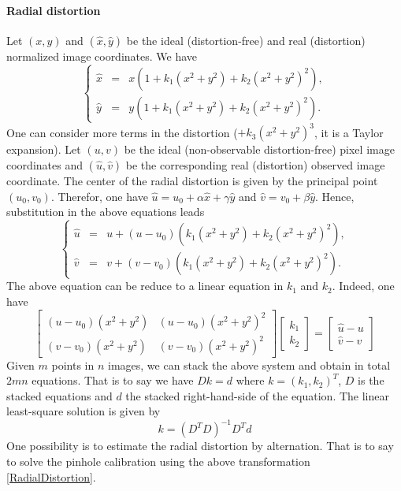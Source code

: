 \documentclass[11pt,a4paper]{article}
\begin{document}
\paragraph{Radial distortion}
Let $(x,y)$ and $(\hat{x},\hat{y})$ be the ideal (distortion-free) and real (distortion) normalized image coordinates. We have
\begin{equation}
\left\{
\begin{array}{rcl}
\hat{x} &=& x \left(1 + k_1(x^2+y^2) + k_2(x^2+y^2)^2\right) ,\\
\hat{y} &=& y \left(1 + k_1(x^2+y^2) + k_2(x^2+y^2)^2\right) .
\end{array}
\right.
\end{equation}
One can consider more terms in the distortion ($+k_3(x^2+y^2)^3$, it is a Taylor expansion). Let $(u,v)$ be the ideal (non-observable distortion-free) pixel image coordinates and $(\hat{u},\hat{v})$ be the corresponding real (distortion) observed image coordinate. The center of the radial distortion is given by the principal point $(u_0,v_0)$. Therefor, one have $\hat{u} = u_0 + \alpha \hat{x} + \gamma \hat{y}$ and $\hat{v} = v_0 + \beta \hat{y}$. Hence, substitution in the above equations leads
\begin{equation}
\left\{
\begin{array}{rcl}
\hat{u} &=& u + (u-u_0) \left(k_1(x^2+y^2) + k_2(x^2+y^2)^2\right) ,\\
\hat{v} &=& v + (v-v_0) \left(k_1(x^2+y^2) + k_2(x^2+y^2)^2\right) .
\end{array}
\right.
\label{RadialDistortion}
\end{equation}
The above equation can be reduce to a linear equation in $k_1$ and $k_2$. Indeed, one have
\begin{equation}
\left[
\begin{array}{cc}
(u-u_0)(x^2+y^2) & (u-u_0)(x^2+y^2)^2 \\
(v-v_0)(x^2+y^2) & (v-v_0)(x^2+y^2)^2 
\end{array}
\right]
\left[
\begin{array}{c}
k_1 \\
k_2
\end{array}
\right]
=
\left[
\begin{array}{c}
\hat{u}-u \\
\hat{v}-v
\end{array}
\right]
\end{equation}
Given $m$ points in $n$ images, we can stack the above system and obtain in total $2mn$ equations. That is to say we have $D k = d $ where $k=(k_1,k_2)^T$, $D$ is the stacked equations and $d$ the stacked right-hand-side of the equation. The linear least-square solution is given by
\begin{equation}
k = (D^T D)^{-1} D^T d
\end{equation}
One possibility is to estimate the radial distortion by alternation. That is to say to solve the pinhole calibration using the above transformation \eqref{RadialDistortion}.
\end{document}
